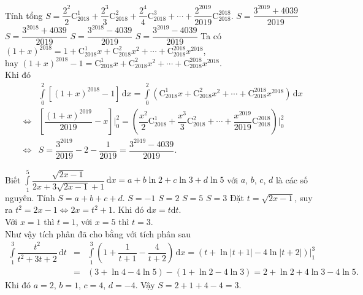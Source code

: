 \begin{ex}%
 Tính tổng $S = \dfrac{2^2}{2}\mathrm{C}_{2018}^1 + \dfrac{2^3}{3}\mathrm{C}_{2018}^2 + \dfrac{2^4}{4}\mathrm{C}_{2018}^3 + \cdots + \dfrac{2^{2019}}{2019}\mathrm{C}_{2018}^{2018}$.
 \choice
  {$S=\dfrac{3^{2019}+4039}{2019}$}
  {$S=\dfrac{3^{2018}+4039}{2019}$}
  {$S=\dfrac{3^{2018}-4039}{2019}$}
  {\True $S=\dfrac{3^{2019}-4039}{2019}$}
 \loigiai
  {
  Ta có $(1+x)^{2018} = 1 + \mathrm{C}_{2018}^1 x + \mathrm{C}_{2018}^2 x^2 + \cdots + \mathrm{C}_{2018}^{2018} x^{2018}$,\\
  hay $(1+x)^{2018} - 1 = \mathrm{C}_{2018}^1 x + \mathrm{C}_{2018}^2 x^2 + \cdots + \mathrm{C}_{2018}^{2018} x^{2018}$.\\
  Khi đó
  \begin{eqnarray*}
   & & \displaystyle\int\limits_0^2 \left[ (1+x)^{2018} - 1 \right] \mathrm{\,d}x = \displaystyle\int\limits_0^2 \left( \mathrm{C}_{2018}^1 x + \mathrm{C}_{2018}^2 x^2 + \cdots + \mathrm{C}_{2018}^{2018} x^{2018} \right) \mathrm{\,d}x\\
   &\Leftrightarrow & \left[\dfrac{(1+x)^{2019}}{2019} - x\right]\bigg|_0^2 = \left( \dfrac{x^2}{2}\mathrm{C}_{2018}^1 + \dfrac{x^3}{3}\mathrm{C}_{2018}^2 + \cdots + \dfrac{x^{2019}}{2019}\mathrm{C}_{2018}^{2018} \right)\bigg|_0^2 \\
   &\Leftrightarrow & S = \dfrac{3^{2019}}{2019} - 2 - \dfrac{1}{2019} = \dfrac{3^{2019}-4039}{2019}.
  \end{eqnarray*}
  }
\end{ex}


\begin{ex}%
 Biết $\displaystyle\int\limits_1^5 \dfrac{\sqrt{2x-1}}{2x+3\sqrt{2x-1}+1}\mathrm{\,d}x = a+b\ln2+c\ln3+d\ln5$ với $a$, $b$, $c$, $d$ là các số nguyên. Tính $S = a+b+c+d$.
 \choice
  {$S=-1$}
  {$S=2$}
  {$S=5$}
  {\True $S=3$}
 \loigiai
  {
  Đặt $t = \sqrt{2x-1}$, suy ra $t^2 = 2x-1 \Leftrightarrow 2x = t^2+1$. Khi đó $\mathrm{d}x = t\mathrm{d}t$.\\
  Với $x=1$ thì $t=1$, với $x=5$ thì $t=3$.\\
  Như vậy tích phân đã cho bằng với tích phân sau
  \begin{eqnarray*}
   \displaystyle\int\limits_1^3 \dfrac{t^2}{t^2+3t+2} \mathrm{\,d}t &=& \displaystyle\int\limits_1^3 \left( 1 + \dfrac{1}{t+1} - \dfrac{4}{t+2} \right) \mathrm{\,d}x = \left( t + \ln|t+1| - 4\ln|t+2| \right)\bigg|_1^3\\
   &=& (3 + \ln 4 - 4\ln 5) - (1 + \ln 2 - 4\ln 3) = 2 + \ln 2 + 4\ln 3 - 4\ln 5.
  \end{eqnarray*}
  Khi đó $a=2$, $b=1$, $c=4$, $d=-4$. Vậy $S = 2+1+4-4 = 3$.
  }
\end{ex}


